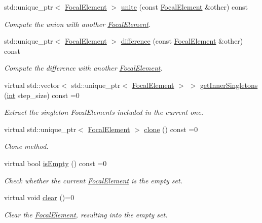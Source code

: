 \begin{DoxyCompactItemize}
std\+::unique\+\_\+ptr$<$ \hyperlink{classFocalElement}{Focal\+Element} $>$ \hyperlink{classFocalElement_a533f16fbd5ae2b3d353d7c9a00bfb2c5}{unite} (const \hyperlink{classFocalElement}{Focal\+Element} \&other) const 
\begin{DoxyCompactList}\small\item\em Compute the union with another \hyperlink{classFocalElement}{Focal\+Element}. \end{DoxyCompactList}\item 
std\+::unique\+\_\+ptr$<$ \hyperlink{classFocalElement}{Focal\+Element} $>$ \hyperlink{classFocalElement_a42ee1e0fff4a088439d823ad54f5e912}{difference} (const \hyperlink{classFocalElement}{Focal\+Element} \&other) const 
\begin{DoxyCompactList}\small\item\em Compute the difference with another \hyperlink{classFocalElement}{Focal\+Element}. \end{DoxyCompactList}\item 
virtual std\+::vector$<$ std\+::unique\+\_\+ptr$<$ \hyperlink{classFocalElement}{Focal\+Element} $>$ $>$ \hyperlink{classFocalElement_ac615e960ea64a4bdc0f442135f6069e2}{get\+Inner\+Singletons} (\hyperlink{CMakeCache_8txt_a79a3d8790b2588b09777910863574e09}{int} step\+\_\+size) const =0
\begin{DoxyCompactList}\small\item\em Extract the singleton Focal\+Elements included in the current one. \end{DoxyCompactList}\item 
virtual std\+::unique\+\_\+ptr$<$ \hyperlink{classFocalElement}{Focal\+Element} $>$ \hyperlink{classFocalElement_a21697fbbbcb144c18fa7b4ecae5e6145}{clone} () const =0
\begin{DoxyCompactList}\small\item\em Clone method. \end{DoxyCompactList}\item 
virtual bool \hyperlink{classFocalElement_aed131a65fdfc885019f9bf8f1d454508}{is\+Empty} () const =0
\begin{DoxyCompactList}\small\item\em Check whether the current \hyperlink{classFocalElement}{Focal\+Element} is the empty set. \end{DoxyCompactList}\item 
virtual void \hyperlink{classFocalElement_a635cb4afffa2dc69cf9fc9ff94a6d90f}{clear} ()=0
\begin{DoxyCompactList}\small\item\em Clear the \hyperlink{classFocalElement}{Focal\+Element}, resulting into the empty set. \end{DoxyCompactList}\end{DoxyCompactItemize}
